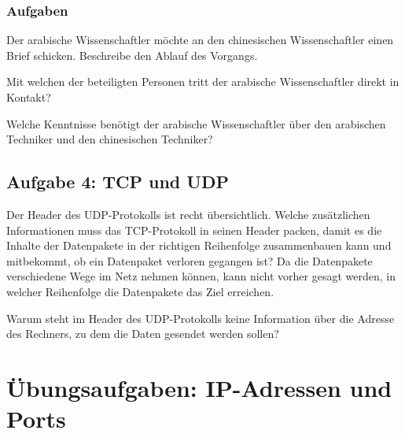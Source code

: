 \subsubsection{Aufgaben}

\begin{compactenum}[a)]
\item Der arabische Wissenschaftler möchte an den chinesischen Wissenschaftler
einen Brief schicken. Beschreibe den Ablauf des Vorgangs.
\item Mit welchen der beteiligten Personen tritt der arabische Wissenschaftler
direkt in Kontakt?
\item Welche Kenntnisse benötigt der arabische Wissenschaftler über den
arabischen Techniker und den chinesischen Techniker?
\end{compactenum}


\subsection{Aufgabe 4: TCP und UDP}

\begin{compactenum}[a)]
\item Der Header des UDP-Protokolls ist recht übersichtlich. Welche zusätzlichen
Informationen muss das TCP-Protokoll in seinen Header packen, damit es die
Inhalte der Datenpakete in der richtigen Reihenfolge zusammenbauen kann und
mitbekommt, ob ein Datenpaket verloren gegangen ist? Da die Datenpakete
verschiedene Wege im Netz nehmen können, kann nicht vorher gesagt werden, in
welcher Reihenfolge die Datenpakete das Ziel erreichen.

\item Warum steht im Header des UDP-Protokolls keine Information über die
Adresse des Rechners, zu dem die Daten gesendet werden sollen?
\end{compactenum}


\section{Übungsaufgaben: IP-Adressen und Ports}


